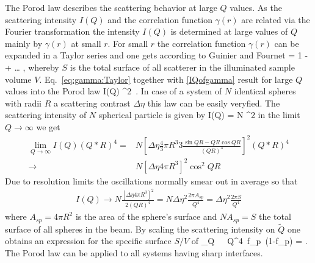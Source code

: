 The Porod law describes the scattering behavior at large $Q$ values.
As the scattering intensity $I(Q)$ and the correlation function $\gamma(r)$
are related via the Fourier transformation the intensity $I(Q)$ is determined
at large values of $Q$ mainly by $\gamma(r)$ at small $r$. For small $r$  the
correlation function $\gamma(r)$ can be expanded in a Taylor series and one
gets according to Guinier and Fournet \cite{book:Guinier:Fournet}
\BE
{} = 1 -  \,  + \dots
\quad ,
\label{eq:gamma:Taylor}
\EE
whereby $S$ is the total surface of all scatterer in the illuminated sample volume $V$.
Eq.\ \ref{eq:gamma:Taylor} together with \ref{IQofgamma} result for large
$Q$ values into the Porod law
\BE
I(Q) \longrightarrow \Delta\eta^2\,  .
\label{eq:Porodlaw}
\EE
In case of a system of $N$ identical spheres with radii $R$ a scattering contrast $\Delta \eta$ this law can be easily veryfied. The scattering intensity of $N$ spherical particle is given by
\BE
I(Q) = N ^2
\EE 
in the limit $Q \rightarrow \infty$ we get
\begin{align}\label{eq:speherePorodLaw}
  \lim_{Q \rightarrow \infty} I(Q) (Q*R)^4 = & N \left[ \Delta\eta  \frac{4}{3}\pi R^3 3 \frac{\sin QR - QR \cos QR}{(QR)^3}\right]^2 (Q*R)^4\\
    \rightarrow & N \left[\Delta\eta 4 \pi R^3 \right]^2 \cos^2 QR 
\end{align}
Due to resolution limits the oscillations normally smear out in average so that 
\begin{align}\label{eq:speherePorodLaw}
I(Q) \rightarrow N\frac{\left[\Delta\eta 4\pi R^3 \right]^2 }{2 (QR)^4} = N \Delta\eta^2\frac{2\pi A_{sp}}{Q^4} =  \Delta\eta^2\frac{2\pi S}{Q^4}
\end{align}
where $A_{sp}=4\pi R^2$ is the area of the sphere's surface and $N A_{sp}=S$ the total surface of all spheres in the beam.
By scaling the scattering intensity on $\tilde Q$ one obtains an expression
for the specific surface $S/V$ of
\BE
\lim_{Q\rightarrow \infty} \, \pi\,\, Q^4\, f_p\,
(1-f_p) =  .
\label{eq:spez:surface}
\EE
The Porod law can be applied to all systems having sharp interfaces.
